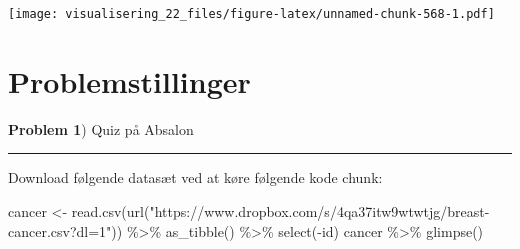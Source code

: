 \documentclass[
]{book}
\newenvironment{Shaded}{\begin{snugshade}}{\end{snugshade}}
\newcommand{\FunctionTok}[1]{\textcolor[rgb]{0.00,0.00,0.00}{#1}}
\newcommand{\NormalTok}[1]{#1}
\newcommand{\OtherTok}[1]{\textcolor[rgb]{0.56,0.35,0.01}{#1}}
\newcommand{\SpecialCharTok}[1]{\textcolor[rgb]{0.00,0.00,0.00}{#1}}
\newcommand{\StringTok}[1]{\textcolor[rgb]{0.31,0.60,0.02}{#1}}
\begin{document}
\texttt{[image: visualisering\_22\_files/figure-latex/unnamed-chunk-568-1.pdf]}

\hypertarget{problemstillinger-9}{%
\section{Problemstillinger}\label{problemstillinger-9}}

\textbf{Problem 1}) Quiz på Absalon

\begin{center}\rule{0.5\linewidth}{0.5pt}\end{center}

Download følgende datasæt ved at køre følgende kode chunk:

\begin{Shaded}
\begin{Highlighting}[]
\NormalTok{cancer }\OtherTok{\textless{}{-}} \FunctionTok{read.csv}\NormalTok{(}\FunctionTok{url}\NormalTok{(}\StringTok{"https://www.dropbox.com/s/4qa37itw9wtwtjg/breast{-}cancer.csv?dl=1"}\NormalTok{)) }\SpecialCharTok{\%\textgreater{}\%} \FunctionTok{as\_tibble}\NormalTok{() }\SpecialCharTok{\%\textgreater{}\%} \FunctionTok{select}\NormalTok{(}\SpecialCharTok{{-}}\NormalTok{id)}
\NormalTok{cancer }\SpecialCharTok{\%\textgreater{}\%} \FunctionTok{glimpse}\NormalTok{()}
\end{Highlighting}
\end{Shaded}
\end{document}
